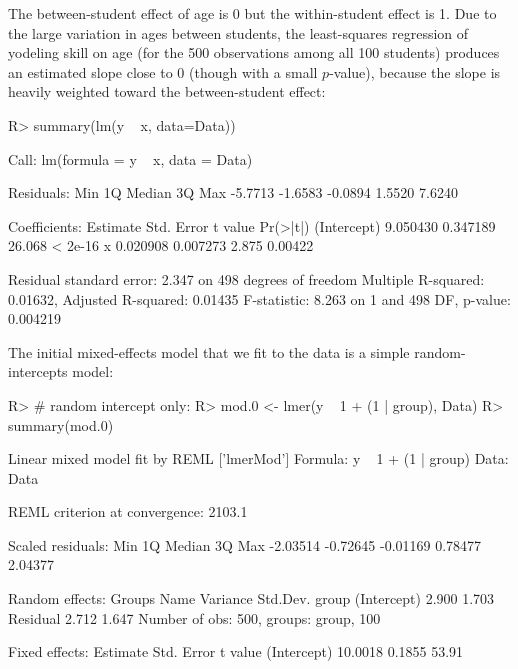 \documentclass[
]{jss}
\begin{document}
\begin{CodeChunk}
\begin{figure}
everal mixed models fit to the data}\label{fig:plot1}
\end{figure}
\end{CodeChunk}

The between-student effect of age is 0 but the within-student effect is
1. Due to the large variation in ages between students, the
least-squares regression of yodeling skill on age (for the 500
observations among all 100 students) produces an estimated slope close
to 0 (though with a small \(p\)-value), because the slope is heavily
weighted toward the between-student effect:

\begin{CodeChunk}
\begin{CodeInput}
R> summary(lm(y ~ x, data=Data))
\end{CodeInput}
\begin{CodeOutput}

Call:
lm(formula = y ~ x, data = Data)

Residuals:
    Min      1Q  Median      3Q     Max 
-5.7713 -1.6583 -0.0894  1.5520  7.6240 

Coefficients:
            Estimate Std. Error t value Pr(>|t|)
(Intercept) 9.050430   0.347189  26.068  < 2e-16
x           0.020908   0.007273   2.875  0.00422

Residual standard error: 2.347 on 498 degrees of freedom
Multiple R-squared:  0.01632,   Adjusted R-squared:  0.01435 
F-statistic: 8.263 on 1 and 498 DF,  p-value: 0.004219
\end{CodeOutput}
\end{CodeChunk}

The initial mixed-effects model that we fit to the data is a simple
random-intercepts model:

\begin{CodeChunk}
\begin{CodeInput}
R> # random intercept only:
R> mod.0 <- lmer(y ~ 1 + (1 | group), Data)
R> summary(mod.0)
\end{CodeInput}
\begin{CodeOutput}
Linear mixed model fit by REML ['lmerMod']
Formula: y ~ 1 + (1 | group)
   Data: Data

REML criterion at convergence: 2103.1

Scaled residuals: 
     Min       1Q   Median       3Q      Max 
-2.03514 -0.72645 -0.01169  0.78477  2.04377 

Random effects:
 Groups   Name        Variance Std.Dev.
 group    (Intercept) 2.900    1.703   
 Residual             2.712    1.647   
Number of obs: 500, groups:  group, 100

Fixed effects:
            Estimate Std. Error t value
(Intercept)  10.0018     0.1855   53.91
\end{CodeOutput}
\end{CodeChunk}
\end{document}
